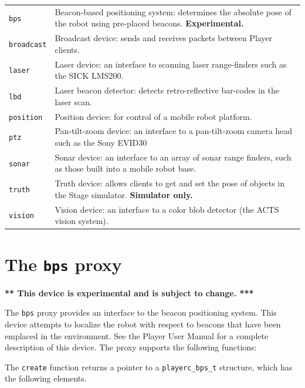 \documentclass[11pt]{report}
\begin{document}
\noindent
\begin{tabularx}{\columnwidth}{lX}
\hline
{\tt bps} & Beacon-based positioning system: determines the absolute pose
of the robot using pre-placed beacons.  {\bf Experimental.}\\
{\tt broadcast} & Broadcast device: sends and receives packets between Player
clients.\\
{\tt laser} & Laser device: an interface to scanning laser range-finders
such as the SICK LMS200.\\
{\tt lbd} & Laser beacon detector: detects retro-reflective bar-codes in
the laser scan.\\
{\tt position} & Position device: for control of a mobile robot platform.\\
{\tt ptz} & Pan-tilt-zoom device: an interface to a pan-tilt-zoom camera
head such as the Sony EVID30 \\
{\tt sonar} & Sonar device: an interface to an array of sonar range finders, 
such as those built into a mobile robot base.\\
{\tt truth} & Truth device: allows clients to get and set the pose of
objects in the Stage simulator.  {\bf Simulator only.}\\
{\tt vision} & Vision device: an interface to a color blob detector (the
ACTS vision system).\\
\hline
\end{tabularx}


\newpage
\section{The {\tt bps} proxy}

{\bf *** This device is experimental and is subject to change. ***}

\noindent The {\tt bps} proxy provides an interface to the beacon positioning
system.  This device attempts to localize the robot with respect to
beacons that have been emplaced in the environment.  See the Player
User Manual for a complete description of this device.  The proxy
supports the following functions:
\begin{quote}

\end{quote}
The {\tt create} function returns a pointer to a {\tt playerc\_bps\_t}
structure, which has the following elements.
\begin{quote}

\end{quote}


\newpage
\end{document}
